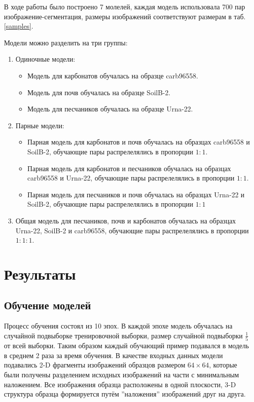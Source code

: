 \documentclass[12pt, a4paper]{extarticle}
\begin{document}
В ходе работы было построено 7 молелей, каждая модель использовала 700 пар изображение-сегментация, размеры изображений соответствуют размерам в таб. \ref{samples}.

Модели можно разделить на три группы:
\begin{enumerate}
	\item Одиночные модели:
	\begin{itemize}
		\item Модель для карбонатов обучалась на образце carb96558.
	
		\item Модель для почв обучалась на образце SoilB-2.
	
		\item Модель для песчаников обучалась на образце Urna-22.
	\end{itemize}
	
	\item Парные модели:
	\begin{itemize}	
		\item Парная модель для карбонатов и почв обучалась на образцах carb96558 и SoilB-2, обучающие пары распрелелялись в пропорции $1:1$.
	
		\item Парная модель для карбонатов и песчаников обучалась на образцах carb96558 и Urna-22, обучающие пары распрелелялись в пропорции $1:1$.
	
	\item  Парная модель для песчаников и почв обучалась на образцах Urna-22 и SoilB-2, обучающие пары распрелелялись в пропорции $1:1$
	\end{itemize}
	
	\item  Общая модель для песчаников, почв и карбонатов обучалась на образцах Urna-22, SoilB-2 и carb96558, обучающие пары распрелелялись в пропорции $1:1:1$.
	
\end{enumerate}


\newpage


\section{Результаты} \label{seg_results}

\subsection{Обучение моделей}

Процесс обучения состоял из 10 эпох. В каждой эпохе модель обучалась на случайной подвыборке тренировочной выборки, размер случайной подвыборки $\frac{1}{5}$ от всей выборки. Таким образом каждый обучающий пример подавался в модель в среднем 2 раза за время обучения. В качестве входных данных модели подавались 2-D фрагменты изображений образцов размером $64 \times 64$, которые были получены разделением исходных изображений на части с минимальным наложением.
Все изображения образца расположены в одной плоскости, 3-D структура образца формируется путём ''наложения'' изображений друг на друга.
\end{document}
